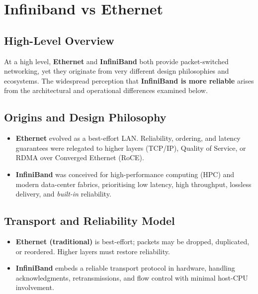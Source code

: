 \documentclass[../../../OAE-SPEC-MAIN.tex]{subfiles}
\begin{document}
\section{Infiniband vs Ethernet}

 
 
 \subsection{High-Level Overview}
At a high level, \textbf{Ethernet} and \textbf{InfiniBand} both provide
packet-switched networking, yet they originate from very different
design philosophies and ecosystems.  The widespread perception that
\textbf{InfiniBand is more reliable} arises from the architectural and
operational differences examined below.

\subsection{Origins and Design Philosophy}
\begin{itemize}
  \item \textbf{Ethernet} evolved as a best-effort LAN.  Reliability,
        ordering, and latency guarantees were relegated to higher
        layers (TCP/IP), Quality of Service, or RDMA over Converged
        Ethernet (RoCE).
  \item \textbf{InfiniBand} was conceived for high-performance
        computing (HPC) and modern data-center fabrics, prioritising
        low latency, high throughput, lossless delivery, and
        \emph{built-in} reliability.
\end{itemize}

\subsection{Transport and Reliability Model}
\begin{itemize}
  \item \textbf{Ethernet (traditional)} is best-effort; packets may be
        dropped, duplicated, or reordered.  Higher layers must restore
        reliability.
  \item \textbf{InfiniBand} embeds a reliable transport protocol in
        hardware, handling acknowledgments, retransmissions, and flow
        control with minimal host-CPU involvement.
\end{itemize}
\end{document}
